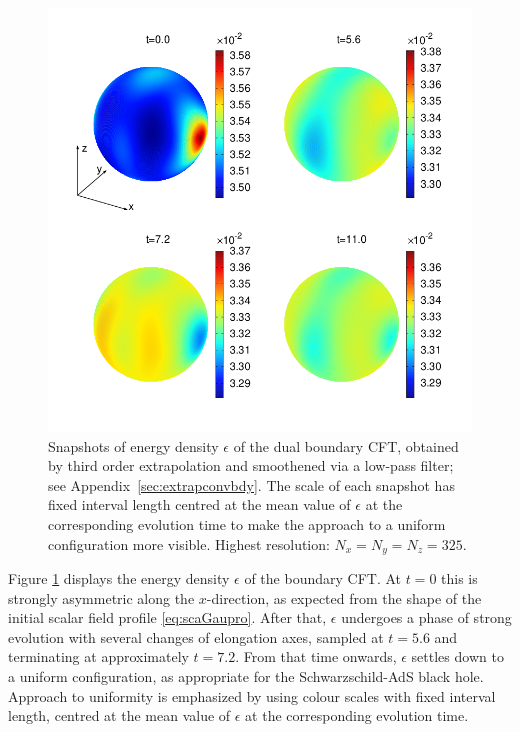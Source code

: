 \documentclass[aps,letterpaper,twocolumn,nofootinbib]{revtex4}
\numberwithin{equation}{section}
\begin{document}
\begin{figure}[!t]
        \centering
        \includegraphics[width=5.0in,clip=true]{sphereplots_bdyenergydensity_L3_2by2.png}
\parbox{5.0in}{\caption{Snapshots of energy density $\epsilon$ of the dual boundary CFT, obtained by third order extrapolation and smoothened via a low-pass filter;
see Appendix~\ref{sec:extrapconvbdy}. The scale of each snapshot has fixed interval length centred at the mean value of $\epsilon$ at the corresponding evolution time to make the approach to a uniform configuration more visible. Highest resolution: $N_x=N_y=N_z=325$.
        }\label{fig:snapshotsenergydensity}}
\end{figure}

Figure \ref{fig:snapshotsenergydensity} displays the energy density $\epsilon$ of the boundary CFT.
At $t=0$ this is strongly asymmetric along the $x$-direction, as expected from the shape of the initial scalar field profile \eqref{eq:scaGaupro}. 
After that, $\epsilon$ undergoes a phase of strong evolution with several changes of elongation axes, sampled at $t=5.6$ and terminating at approximately $t=7.2$. From that time onwards, $\epsilon$ settles down to a uniform configuration, as appropriate for the Schwarzschild-AdS black hole. Approach to uniformity is emphasized by using colour scales with fixed interval length, centred at the mean value of $\epsilon$ at the corresponding evolution time.
\end{document}
